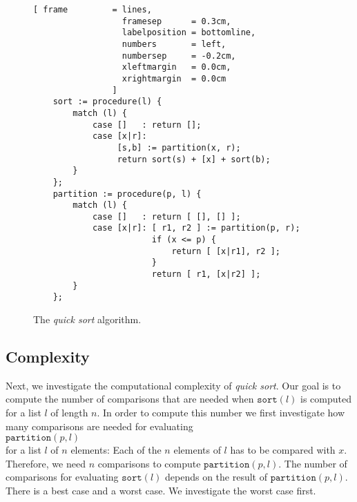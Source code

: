 \begin{figure}[!ht]
  \centering
\begin{Verbatim}[ frame         = lines, 
                  framesep      = 0.3cm, 
                  labelposition = bottomline,
                  numbers       = left,
                  numbersep     = -0.2cm,
                  xleftmargin   = 0.0cm,
                  xrightmargin  = 0.0cm
                ]
    sort := procedure(l) {
        match (l) {
            case []   : return [];
            case [x|r]: 
                 [s,b] := partition(x, r);
                 return sort(s) + [x] + sort(b);
        }
    };
    partition := procedure(p, l) {
        match (l) {
            case []   : return [ [], [] ];
            case [x|r]: [ r1, r2 ] := partition(p, r);
                        if (x <= p) {
                            return [ [x|r1], r2 ];
                        } 
                        return [ r1, [x|r2] ];
        }
    };
\end{Verbatim}
\vspace*{-0.3cm}
  \caption{The \emph{quick sort} algorithm.}
  \label{fig:quick-sort.stlx}
\end{figure}

\subsection{Complexity}
Next, we investigate the computational complexity of \emph{quick sort}.
Our goal is to compute the number of comparisons that are needed when
$\texttt{sort}(l)$ is computed for a list $l$ of length $n$.  In order to compute this number we
first investigate how many comparisons are needed for evaluating
\\[0.2cm]
\hspace*{1.3cm}
$\texttt{partition}(p,l)$ 
\\[0.2cm]
for a list $l$ of $n$ elements: Each of the $n$ elements of $l$ has to be compared with $x$.
Therefore,  we need $n$ comparisons to compute $\mathtt{partition}(p,l)$.  The number of comparisons
for evaluating $\mathtt{sort}(l)$ depends on the result of $\texttt{partition}(p,l)$.  There is a
best case and a worst case.  We investigate the worst case first.

